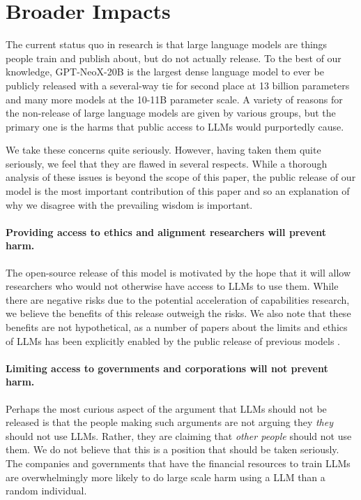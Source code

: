 \documentclass[11pt]{article}
\newcommand{\model}{GPT-NeoX-20B}
\begin{document}
\section{Broader Impacts}
\label{sec:broader-impacts}

The current status quo in research is that large language models are things people train and publish about, but do not actually release. To the best of our knowledge, \model{} is the largest dense language model to ever be publicly released with a several-way tie for second place at 13 billion parameters \citep{fairseq-13B,xue2020mt5,xue2021byt5} and many more models at the 10-11B parameter scale. A variety of reasons for the non-release of large language models are given by various groups, but the primary one is the harms that public access to LLMs would purportedly cause.

We take these concerns quite seriously. However, having taken them quite seriously, we feel that they are flawed in several respects. While a thorough analysis of these issues is beyond the scope of this paper, the public release of our model is the most important contribution of this paper and so an explanation of why we disagree with the prevailing wisdom is important.

\paragraph{Providing access to ethics and alignment researchers will prevent harm.} The open-source release of this model is motivated by the hope that it will allow researchers who would not otherwise have access to LLMs to use them. While there are negative risks due to the potential acceleration of capabilities research, we believe the benefits of this release outweigh the risks. We also note that these benefits are not hypothetical, as a number of papers about the limits and ethics of LLMs has been explicitly enabled by the public release of previous models \citep{zhang2021counterfactual,kandpal2022deduplicating,carlini2022quantifying,birhane2021multimodal,logit-lens,meng2022locating, lin2021truthfulqa}.

\paragraph{Limiting access to governments and corporations will not prevent harm.} Perhaps the most curious aspect of the argument that LLMs should not be released is that the people making such arguments are not arguing they \textit{they} should not use LLMs. Rather, they are claiming that \textit{other people} should not use them. We do not believe that this is a position that should be taken seriously. The companies and governments that have the financial resources to train LLMs are overwhelmingly more likely to do large scale harm using a LLM than a random individual.
\end{document}
